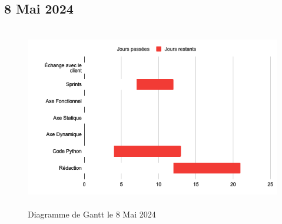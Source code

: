 \subsection*{8 Mai 2024}
\begin{figure}[H]
	\centering
	\includegraphics[height=8cm]{img/gantt_08052024.png}
	\caption{Diagramme de Gantt le 8 Mai 2024}
\end{figure}


